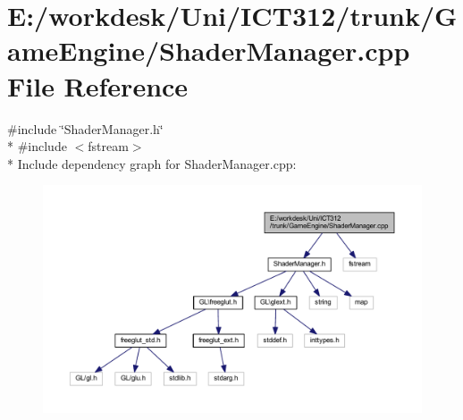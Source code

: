 \section{E\+:/workdesk/\+Uni/\+I\+C\+T312/trunk/\+Game\+Engine/\+Shader\+Manager.cpp File Reference}
\label{_shader_manager_8cpp}
{\ttfamily \#include \char`\"{}Shader\+Manager.\+h\char`\"{}}\\*
{\ttfamily \#include $<$fstream$>$}\\*
Include dependency graph for Shader\+Manager.\+cpp\+:\nopagebreak
\begin{figure}[H]
\begin{center}
\leavevmode
\includegraphics[width=350pt]{d9/d74/_shader_manager_8cpp__incl}
\end{center}
\end{figure}
